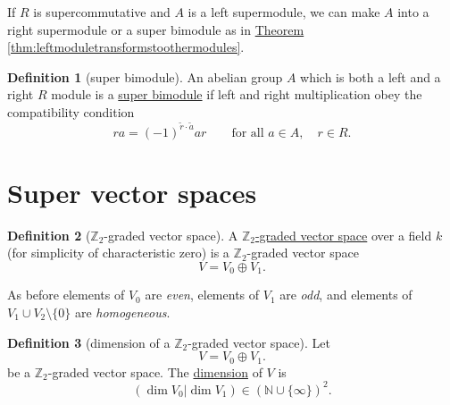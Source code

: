 \documentclass[a4paper,10pt]{scrreprt}
\newcommand{\Z}{\mathbb{Z}}
\newcommand{\N}{\mathbb{N}}
\newcommand{\defn}[1]{\ul{#1}}
\theoremstyle{definition}
\newtheorem{definition}{Definition}[section]
\theoremstyle{plain}
\newtheorem{lemma}{Lemma}[section]
\theoremstyle{remark}
\begin{document}
If $R$ is supercommutative and $A$ is a left supermodule, we can make $A$ into a right supermodule or a super bimodule as in \hyperref[thm:leftmoduletransformstoothermodules]{Theorem \ref*{thm:leftmoduletransformstoothermodules}}.

\begin{definition}[super bimodule]
  \label{def:superbimodule}
  An abelian group $A$ which is both a left and a right $R$ module is a \defn{super bimodule} if left and right multiplication obey the compatibility condition
  \begin{equation*}
    ra = (-1)^{\tilde{r}\cdot \tilde{a}} ar\qquad \text{for all }a\in A,\quad r \in R.
  \end{equation*}
\end{definition}



\section{Super vector spaces}
\begin{definition}[$\Z_{2}$-graded vector space]
  \label{def:z2gradedvectorspace}
  A \defn{$\Z_{2}$-graded vector space} over a field $k$ (for simplicity of characteristic zero) is a $\Z_{2}$-graded vector space
  \begin{equation*}
    V = V_{0} \oplus V_{1}.
  \end{equation*}
\end{definition}
As before elements of $V_{0}$ are \emph{even}, elements of $V_{1}$ are \emph{odd}, and elements of $V_{1} \cup V_{2} \setminus \{0\}$ are \emph{homogeneous}.

\begin{definition}[dimension of a $\Z_{2}$-graded vector space]
  \label{def:dimensionofaz2gradedvectorspace}
  Let 
  \begin{equation*}
    V = V_{0} \oplus V_{1}.
  \end{equation*}
  be a $\Z_{2}$-graded vector space. The \defn{dimension} of $V$ is
  \begin{equation*}
    (\dim V_{0}| \dim V_{1}) \in (\N \cup \{\infty\})^{2}.
  \end{equation*}
\end{definition} 
\end{document}
